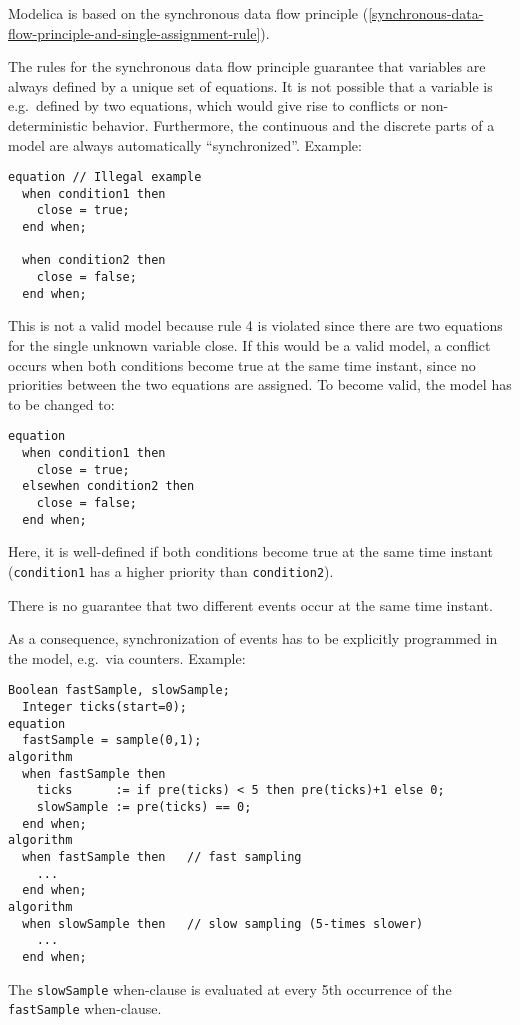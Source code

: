 Modelica is based on the synchronous data flow principle (\autoref{synchronous-data-flow-principle-and-single-assignment-rule}).

\begin{nonnormative}
The rules for the synchronous data flow principle guarantee
that variables are always defined by a unique set of equations. It is
not possible that a variable is e.g.\ defined by two equations, which
would give rise to conflicts or non-deterministic behavior. Furthermore,
the continuous and the discrete parts of a model are always
automatically ``synchronized''. Example:
\begin{lstlisting}[language=modelica]
equation // Illegal example
  when condition1 then
    close = true;
  end when;

  when condition2 then
    close = false;
  end when;
\end{lstlisting}

This is not a valid model because rule 4 is violated since there
are two equations for the single unknown variable close. If this would
be a valid model, a conflict occurs when both conditions become true at
the same time instant, since no priorities between the two equations are
assigned. To become valid, the model has to be changed to:
\begin{lstlisting}[language=modelica]
equation
  when condition1 then
    close = true;
  elsewhen condition2 then
    close = false;
  end when;
\end{lstlisting}

Here, it is well-defined if both conditions become true at the
same time instant (\lstinline!condition1! has a higher priority than
\lstinline!condition2!).
\end{nonnormative}

There is no guarantee that two different events occur at the same time
instant.

\begin{nonnormative}
As a consequence, synchronization of events has to be
explicitly programmed in the model, e.g.\ via counters. Example:
\begin{lstlisting}[language=modelica]
  Boolean fastSample, slowSample;
  Integer ticks(start=0);
equation
  fastSample = sample(0,1);
algorithm
  when fastSample then
    ticks      := if pre(ticks) < 5 then pre(ticks)+1 else 0;
    slowSample := pre(ticks) == 0;
  end when;
algorithm
  when fastSample then   // fast sampling
    ...
  end when;
algorithm
  when slowSample then   // slow sampling (5-times slower)
    ...
  end when;
\end{lstlisting}

The \lstinline!slowSample! when-clause is evaluated at every 5th occurrence of the
\lstinline!fastSample! when-clause.
\end{nonnormative}

